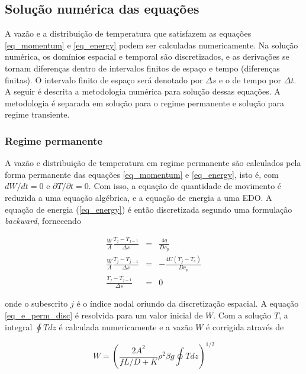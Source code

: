 \documentclass[a4paper,portuguese,10pt]{article}
\renewcommand{\D}{\partial}
\begin{document}
\subsection{Solução numérica das equações\label{sec_solucao}}

A vazão e a distribuição de temperatura que satisfazem as equações \ref{eq_momentum} e \ref{eq_energy} podem ser calculadas numericamente. Na solução numérica, os domínios espacial e temporal são discretizados, e as derivações se tornam diferenças dentro de intervalos finitos de espaço e tempo (diferenças finitas). O intervalo finito de espaço será denotado por $\Delta s$ e o de tempo por $\Delta t$. A seguir é descrita a metodologia numérica para solução dessas equações. A metodologia é separada em solução para o regime permanente e solução para regime transiente.

\subsubsection{Regime permanente}

A vazão e distribuição de temperatura em regime permanente são calculados pela forma permanente das equações \ref{eq_momentum} e \ref{eq_energy}, isto é, com $dW/dt = 0$ e $\D T/\D t = 0$. Com isso, a equação de quantidade de movimento é reduzida a uma equação algébrica, e a equação de energia a uma EDO. A equação de energia (\ref{eq_energy}) é então discretizada segundo uma formulação {\it backward}, fornecendo

\begin{subequations}
\begin{eqnarray}
  \frac{W}{A}\frac{T_j-T_{j-1}}{\Delta s} &=& \frac{4q}{Dc_p}\\
  \frac{W}{A}\frac{T_j-T_{j-1}}{\Delta s} &=& -\frac{4U(T_j-T_s)}{Dc_p}\\
  \frac{T_j-T_{j-1}}{\Delta s} &=& 0
\label{eq_e_perm_disc}
\end{eqnarray}
\end{subequations}

onde o subescrito $j$ é o índice nodal oriundo da discretização espacial.
A equação \ref{eq_e_perm_disc} é resolvida para um valor inicial de $W$. Com a solução $T$, a integral $\oint Tdz$ é calculada numericamente e a vazão $W$ é corrigida através de

\begin{equation}
  W = \left(\frac{2A^2}{fL/D+K}\rho^2\beta g\oint Tdz\right)^{1/2}
  \label{eq_m_perm_disc}
\end{equation}
\end{document}
